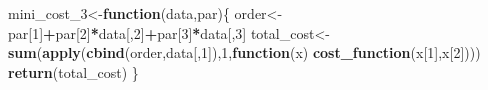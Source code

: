 \documentclass[
]{article}
\newenvironment{Shaded}{\begin{snugshade}}{\end{snugshade}}
\newcommand{\ControlFlowTok}[1]{\textcolor[rgb]{0.13,0.29,0.53}{\textbf{#1}}}
\newcommand{\DecValTok}[1]{\textcolor[rgb]{0.00,0.00,0.81}{#1}}
\newcommand{\KeywordTok}[1]{\textcolor[rgb]{0.13,0.29,0.53}{\textbf{#1}}}
\newcommand{\NormalTok}[1]{#1}
\newcommand{\OperatorTok}[1]{\textcolor[rgb]{0.81,0.36,0.00}{\textbf{#1}}}
\begin{document}
\begin{Shaded}
\begin{Highlighting}[]
\NormalTok{mini_cost_}\DecValTok{3}\NormalTok{<-}\ControlFlowTok{function}\NormalTok{(data,par)\{}
\NormalTok{  order<-par[}\DecValTok{1}\NormalTok{]}\OperatorTok{+}\NormalTok{par[}\DecValTok{2}\NormalTok{]}\OperatorTok{*}\NormalTok{data[,}\DecValTok{2}\NormalTok{]}\OperatorTok{+}\NormalTok{par[}\DecValTok{3}\NormalTok{]}\OperatorTok{*}\NormalTok{data[,}\DecValTok{3}\NormalTok{]}
\NormalTok{  total_cost<-}\KeywordTok{sum}\NormalTok{(}\KeywordTok{apply}\NormalTok{(}\KeywordTok{cbind}\NormalTok{(order,data[,}\DecValTok{1}\NormalTok{]),}\DecValTok{1}\NormalTok{,}\ControlFlowTok{function}\NormalTok{(x) }\KeywordTok{cost_function}\NormalTok{(x[}\DecValTok{1}\NormalTok{],x[}\DecValTok{2}\NormalTok{])))}
  \KeywordTok{return}\NormalTok{(total_cost)}
\NormalTok{\}}


\end{Highlighting}
\end{Shaded}
\end{document}
